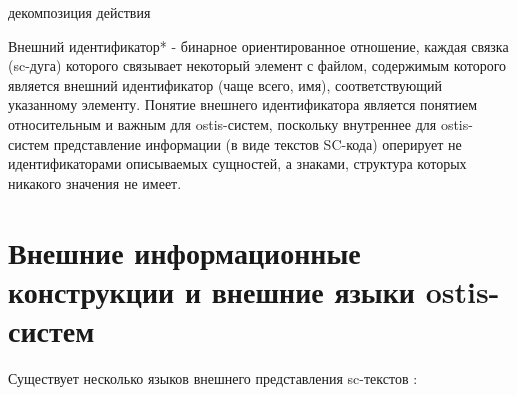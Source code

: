 \begin{SCn}

    \begin{scnrelfromset}{декомпозиция действия}
        \begin{scnindent}
        \end{scnindent}
        \begin{scnindent}
        \end{scnindent}
    \end{scnrelfromset}

\end{SCn}

Внешний идентификатор* - бинарное ориентированное отношение, каждая связка (sc-дуга) которого связывает некоторый элемент с файлом, содержимым которого является внешний идентификатор (чаще всего, имя), соответствующий указанному элементу.
Понятие внешнего идентификатора является понятием относительным и важным для ostis-систем, поскольку внутреннее для ostis-систем представление информации (в виде текстов SC-кода) оперирует не идентификаторами описываемых сущностей, а знаками, структура которых никакого значения не имеет.



\section{Внешние информационные конструкции и внешние языки ostis-систем}
\label{sec_external_information_constructs_external_lang}

Существует несколько языков внешнего представления sc-текстов :

